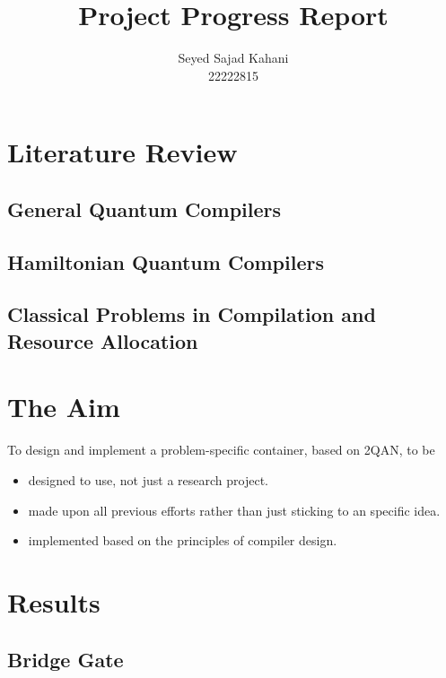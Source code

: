 \documentclass{article}
\title{Project Progress Report}
\author{Seyed Sajad Kahani \\ 22222815}
\begin{document}
\maketitle

\nocite{*}

\section{Literature Review}

\subsection{General Quantum Compilers}

\printbibliography[heading=none,keyword=general]

\subsection{Hamiltonian Quantum Compilers}

\printbibliography[heading=none,keyword=hamiltonian]

\subsection{Classical Problems in Compilation and Resource Allocation}

\printbibliography[heading=none,keyword=classical]

\section{The Aim}

To design and implement a problem-specific container, based on 2QAN, to be 

\begin{itemize}
    \item designed to use, not just a research project.
    \item made upon all previous efforts rather than just sticking to an specific idea.
    \item implemented based on the principles of compiler design.
\end{itemize}

\section{Results}

\subsection{Bridge Gate}
\end{document}

